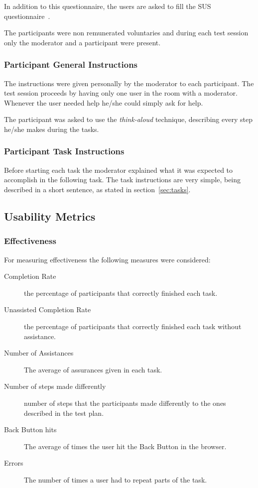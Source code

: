 \documentclass[a4paper]{article}
\begin{document}
In addition to this questionnaire, the users are asked to fill the SUS questionnaire~\citep{brooke1996sus}.

The participants were non remunerated voluntaries and during each test session only the moderator and a participant were present.

\subsubsection{Participant General Instructions}

The instructions were given personally by the moderator to each participant. The test session proceeds by having only one user in the room with a moderator. Whenever the user needed help he/she could simply ask for help.

The participant was asked to use the \textit{think-aloud} technique, describing every step he/she makes during the tasks.

\subsubsection{Participant Task Instructions}
Before starting each task the moderator explained what it was expected to accomplish in the following task. The task instructions are very simple, being described in a short sentence, as stated in section~\ref{sec:tasks}.

\subsection{Usability Metrics}
\subsubsection{Effectiveness}
For measuring effectiveness the following measures were considered:

\begin{description}
    
 \item[Completion Rate] the percentage of participants that correctly finished each task.
 \item[Unassisted Completion Rate] the percentage of participants that correctly finished each task without assistance.
 \item[Number of Assistances] The average of assurances given in each task.
 \item[Number of steps made differently] number of steps that the participants made differently to the ones described in the test plan.
 \item[Back Button hits] The average of times the user hit the Back Button in the browser.
 \item[Errors] The number of times a user had to repeat parts of the task.

\end{description} 
 
\end{document}
